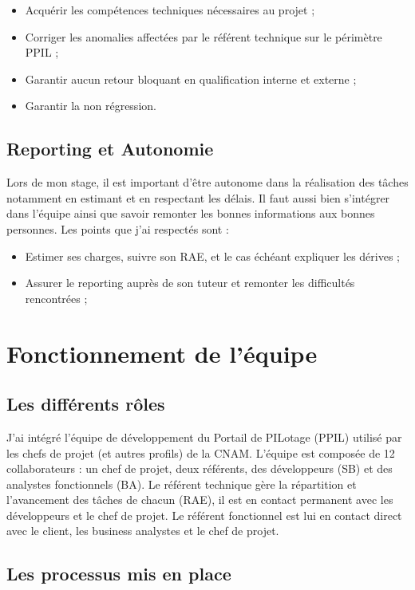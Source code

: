 \begin{itemize}
    \item Acquérir les compétences techniques nécessaires au projet ; 
    \item Corriger les anomalies affectées par le référent technique sur le périmètre PPIL ;
    \item Garantir aucun retour bloquant en qualification interne et externe ;
    \item Garantir la non régression.
\end{itemize}

\subsection{Reporting et Autonomie}

Lors de mon stage, il est important d'être autonome dans la réalisation des tâches notamment en estimant et en respectant les délais. Il faut aussi bien s'intégrer dans l'équipe ainsi que savoir remonter les bonnes informations aux bonnes personnes. Les points que j'ai respectés sont :
\begin{itemize}
    \item Estimer ses charges, suivre son RAE, et le cas échéant expliquer les dérives ;
    \item Assurer le reporting auprès de son tuteur et remonter les difficultés rencontrées ;
\end{itemize}

\section{Fonctionnement de l'équipe}

\subsection{Les différents rôles}

J'ai intégré l'équipe de développement du Portail de PILotage (PPIL) utilisé par les chefs de projet (et autres profils) de la CNAM. L'équipe est composée de 12 collaborateurs : un chef de projet, deux référents, des développeurs (SB) et des analystes fonctionnels (BA).
Le référent technique gère la répartition et l'avancement des tâches de chacun (RAE), il est en contact permanent avec les développeurs et le chef de projet. Le référent fonctionnel est lui en contact direct avec le client, les business analystes et le chef de projet.

\subsection{Les processus mis en place}
